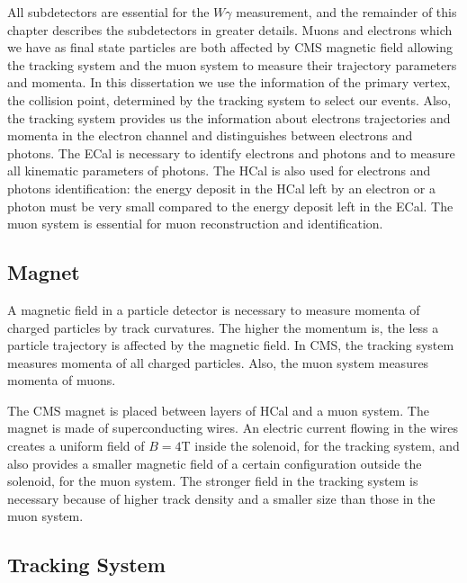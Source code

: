 All subdetectors are essential for the $W\gamma$ measurement, and the remainder of this chapter describes the subdetectors in greater details. Muons and electrons which we have as final state particles are both affected by CMS magnetic field allowing the tracking system and the muon system to measure their trajectory parameters and momenta. In this dissertation we use the information of the primary vertex, the collision point, determined by the tracking system to select our events. Also, the tracking system provides us the information about electrons trajectories and momenta in the electron channel and distinguishes between electrons and photons. The ECal is necessary to identify electrons and photons and to measure all kinematic parameters of photons. The HCal is also used for electrons and photons identification: the energy deposit in the HCal left by an electron or a photon must be very small compared to the energy deposit left in the ECal. The muon system is essential for muon reconstruction and identification.

\subsection{Magnet}

A magnetic field in a particle detector is necessary to measure momenta of charged particles by track curvatures. The higher the momentum is, the less a particle trajectory is affected by the magnetic field. In CMS, the tracking system measures  momenta of all charged particles. Also, the muon system measures momenta of muons. 

The CMS magnet is placed between layers of HCal and a muon system. The magnet is made of superconducting wires. An electric current flowing in the wires creates a uniform field of $B=4$T inside the solenoid, for the tracking system, and also provides a smaller magnetic field of a certain configuration outside the solenoid, for the muon system. The stronger field in the tracking system is necessary because of higher track density and a smaller size than those in the muon system.

\subsection{Tracking System}

